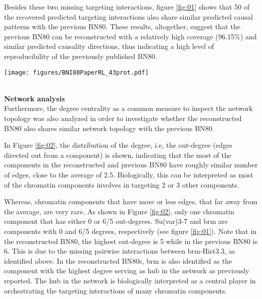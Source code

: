 \documentclass{bioinfo}
\begin{document}
Besides these two missing targeting interactions, figure \ref{fig:01} shows that 50 of the recovered predicted targeting interactions also share similar predicted causal patterns with the previous BN80. These results, altogether, suggest that the previous BN80 can be reconstructed with a relatively high coverage (96.15\%) and similar predicted causality directions, thus indicating a high level of reproducibility of the previously published BN80.\\
 \begin{figure*}[!tpb]%
\centerline{\texttt{[image: figures/BNI80PaperRL\_43prot.pdf]}}
\caption{Inferred BN80. A) from Paper [1] B) the reconstructed network. The number in each node(chromatin component) denotes the out-degree(number of edges directed out from the node). The thickness of the edges corresponds to the weights of the bootstrapping scores in the scale of 0-10.}\label{fig:01}
\end{figure*}
\\
\textbf{Network analysis}\\
Furthermore, the degree centrality as a common measure to inspect the network topology was also analyzed in order to investigate whether the reconstructed BN80 also shares similar network topology with the previous BN80. 

In Figure \ref{fig:02}, the distribution of  the degree, i.e, the out-degree (edges directed out from a component) is shown, indicating that the most of the components in the reconstructed and previous BN80 have roughly similar number of edges, close to the average of 2.5. Biologically, this can be interpreted as most of the chromatin components involves in targeting 2 or 3 other components. 

Whereas, chromatin components that have more or less edges, that far away from the average, are very rare. As shown in Figure \ref{fig:02}, only one chromatin component that has either 0 or 6/5 out-degrees. Su(var)3-7 and brm are components with 0 and 6/5 degrees, respectively (see figure \ref{fig:01}). Note that in the reconstructed BN80, the highest out-degree is 5 while in the previous BN80 is 6. This is due to the missing pairwise interactions between brm-Hist3.3, as identified above. In the reconstructed BN80s, brm is also identified as the component with the highest degree serving as hub in the network as previously reported. The hub in the network is biologically interpreted as a central player in orchestrating the targeting interactions of many chromatin components.
\end{document}
